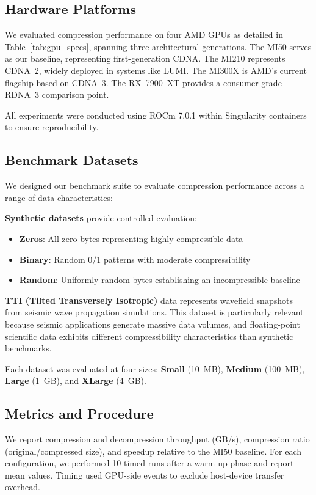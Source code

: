 \documentclass[runningheads]{llncs}
\begin{document}
\subsection{Hardware Platforms}

We evaluated compression performance on four AMD GPUs as detailed in Table~\ref{tab:gpu_specs}, spanning three architectural generations. The MI50 serves as our baseline, representing first-generation CDNA. The MI210 represents CDNA~2, widely deployed in systems like LUMI. The MI300X is AMD's current flagship based on CDNA~3. The RX~7900~XT provides a consumer-grade RDNA~3 comparison point.

All experiments were conducted using ROCm 7.0.1 within Singularity containers to ensure reproducibility.

\subsection{Benchmark Datasets}

We designed our benchmark suite to evaluate compression performance across a range of data characteristics:

\textbf{Synthetic datasets} provide controlled evaluation:
\begin{itemize}
    \item \textbf{Zeros}: All-zero bytes representing highly compressible data
    \item \textbf{Binary}: Random 0/1 patterns with moderate compressibility
    \item \textbf{Random}: Uniformly random bytes establishing an incompressible baseline
\end{itemize}

\textbf{TTI (Tilted Transversely Isotropic)} data represents wavefield snapshots from seismic wave propagation simulations. This dataset is particularly relevant because seismic applications generate massive data volumes, and floating-point scientific data exhibits different compressibility characteristics than synthetic benchmarks.

Each dataset was evaluated at four sizes: \textbf{Small} (10~MB), \textbf{Medium} (100~MB), \textbf{Large} (1~GB), and \textbf{XLarge} (4~GB).

\subsection{Metrics and Procedure}

We report compression and decompression throughput (GB/s), compression ratio (original/compressed size), and speedup relative to the MI50 baseline. For each configuration, we performed 10 timed runs after a warm-up phase and report mean values. Timing used GPU-side events to exclude host-device transfer overhead.
\end{document}
